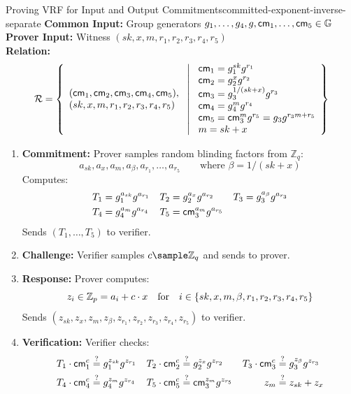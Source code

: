 \begin{protocol}{Proving VRF for Input and Output Commitments}{committed-exponent-inverse-separate}
\textbf{Common Input:} Group generators $g_1,\ldots, g_4, g, \mathsf{cm}_1, \ldots, \mathsf{cm}_5 \in \mathbb{G}$\\
\textbf{Prover Input:} Witness $(sk, x, m, r_1, r_2, r_3, r_4, r_5)$ \\
\textbf{Relation: }
\[
\mathcal{R} = \left\{ 
\begin{array}{l} (\mathsf{cm}_1, \mathsf{cm}_2, \mathsf{cm}_3, \mathsf{cm}_4, \mathsf{cm}_5),\\
(sk, x, m, r_1, r_2, r_3, r_4, r_5) 
\end{array}
\ \middle|
\ \begin{array}{l}
\mathsf{cm}_1 = g_1^{sk} g^{r_1} \\
\mathsf{cm}_2 = g_2^{x} g^{r_2} \\
\mathsf{cm}_3 = g_3^{1/(sk + x)} g^{r_3} \\
\mathsf{cm}_4 = g_4^{m} g^{r_4} \\
\mathsf{cm}_5 = \mathsf{cm}_3^{m} g^{r_5} = g_3 g^{r_3 m + r_5} \\
m = sk + x
\end{array} \right\}
\]
\begin{enumerate}
    \item \textbf{Commitment:} Prover samples random blinding factors from $\mathbb{Z}_q$:
       \[
       a_{sk}, a_x, a_m, a_\beta, a_{r_1}, \ldots, a_{r_5} \qquad \text{where $\beta = 1/(sk + x)$}
       \]
       Computes:
       \begin{align*}
       T_1 &= g_1^{a_{sk}} g^{a_{r_1}} 
       &
       T_2 &= g_2^{a_x} g^{a_{r_2}} 
       &       
       T_3 &= g_3^{a_\beta} g^{a_{r_3}} 
       \\
       T_4 &= g_4^{a_m} g^{a_{r_4}} 
       &
       T_5 &= \mathsf{cm}_3^{a_m} g^{a_{r_5}}
       \end{align*}
       Sends $(T_1, \ldots, T_5)$ to verifier.
    
    \item \textbf{Challenge:} Verifier samples $c \sample \mathbb{Z}_q$ and sends to prover.
    
    \item \textbf{Response:} Prover computes:
     \[
    z_i \in \mathbb{Z}_p = a_i + c \cdot x \quad \text{for} \quad i \in \{ sk, x, m, \beta, r_1, r_2, r_3, r_4, r_5\}
    \]
       Sends $(z_{sk}, z_x,  z_m, z_\beta, z_{r_1}, z_{r_2}, z_{r_3}, z_{r_4}, z_{r_5})$ to verifier.
    
    \item \textbf{Verification:} Verifier checks:
       \begin{align*}
       T_1 \cdot \mathsf{cm}_1^c &\stackrel{?}{=} g_1^{z_{sk}} g^{z_{r_1}} 
       &
       T_2 \cdot \mathsf{cm}_2^c &\stackrel{?}{=} g_2^{z_x} g^{z_{r_2}} &
       T_3 \cdot \mathsf{cm}_3^c &\stackrel{?}{=} g_3^{z_\beta} g^{z_{r_3}} 
       \\
       T_4 \cdot \mathsf{cm}_4^c &\stackrel{?}{=} g_4^{z_m} g^{z_{r_4}} 
       &
       T_5 \cdot \mathsf{cm}_5^c &\stackrel{?}{=} \mathsf{cm}_3^{z_m} g^{z_{r_5}} 
       &
       z_m &\stackrel{?}{=} z_{sk} + z_x
       \end{align*}
\end{enumerate}
\end{protocol}
